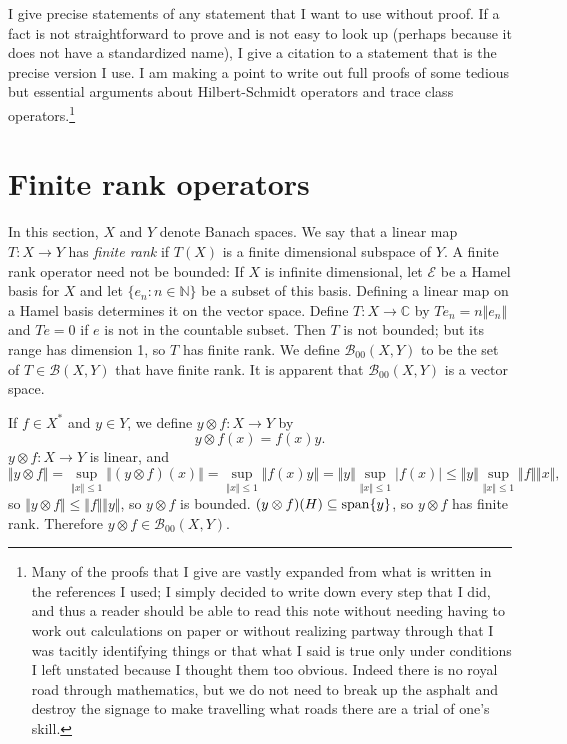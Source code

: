 \documentclass{article}
\newcommand{\Span}{\ensuremath\mathrm{span}}
\newcommand{\norm}[1]{\Vert #1 \Vert}
\begin{document}
I give precise statements of any statement that I want to use without proof. If a fact is not straightforward to prove and is not easy to look up (perhaps because it
does not have a standardized name), I give a citation to a statement that is the precise version  I use.
I am making a point to write out full proofs of some tedious but essential arguments about Hilbert-Schmidt operators and trace class operators.\footnote{Many of the proofs that I give are vastly expanded from what is written in the references I used; I simply decided to write down every step that I did, and thus a reader should
be able to read this note without needing having to work out calculations on paper or without realizing partway through that I was tacitly identifying  things or that
what I said is true only under conditions I left unstated because I thought them too obvious.  Indeed there is no royal road through mathematics, but we do not need to break up
the asphalt and destroy the signage to make travelling what roads there are a trial of one's skill.}




\section{Finite rank operators}
In this section, $X$ and $Y$ denote Banach spaces.
We say that a linear map $T:X \to Y$ has {\em finite rank} if $T(X)$ is a finite dimensional subspace of $Y$. 
A finite rank operator need not be bounded:
If $X$ is infinite dimensional, let $\mathscr{E}$ be a Hamel basis for $X$ and  let $\{e_n:n \in \mathbb{N}\}$ be a subset of this basis. Defining a linear
map on a Hamel basis determines it on the vector space. Define $T:X \to \mathbb{C}$ by $Te_n=n \norm{e_n}$ and $Te=0$ if $e$ is not in the countable subset. Then $T$ is not bounded; but its range has dimension 1, so $T$ has finite rank. 
We define $\mathscr{B}_{00}(X,Y)$ to be the set of $T \in \mathscr{B}(X,Y)$ that have finite rank. It is apparent that $\mathscr{B}_{00}(X,Y)$ is a vector space.

If $f\in X^*$ and $y \in Y$, we define
$y \otimes f:X \to Y$ by
\[
y \otimes f(x)=f(x)y.
\]
$y \otimes f:X \to Y$ is linear, and
\[
\norm{y \otimes f} = \sup_{\norm{x} \leq 1} \norm{(y \otimes f)(x)} =
\sup_{\norm{x} \leq 1} \norm{f(x)y} = \norm{y} \sup_{\norm{x} \leq 1} |f(x)| \leq
\norm{y} \sup_{\norm{x} \leq 1} \norm{f} \norm{x},
\]
so $\norm{y \otimes f} \leq \norm{f} \norm{y}$, so $y \otimes f$ is bounded. $(y \otimes f)(H) \subseteq \Span\{y\}$, so $y \otimes f$ has finite rank.
Therefore $y \otimes f \in \mathscr{B}_{00}(X,Y)$.
\end{document}
